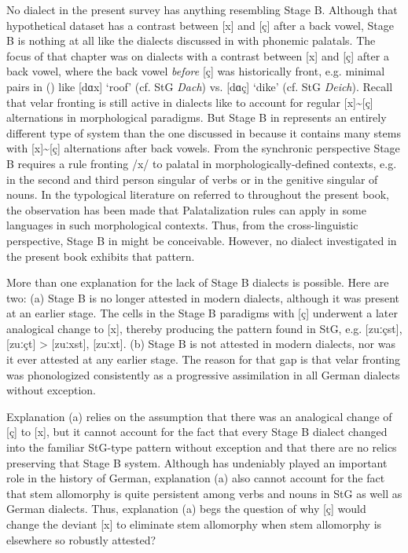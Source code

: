 No dialect in the present survey has anything resembling Stage B. Although that hypothetical dataset has a contrast between [x] and [ç] after a back vowel, Stage B is nothing at all like the dialects discussed in  with phonemic palatals. The focus of that chapter was on dialects with a contrast between [x] and [ç] after a back vowel, where the back vowel \textit{before} [ç] was historically front, e.g. minimal pairs in  () like [dɑx] ‘roof’ (cf. StG \textit{Dach}) vs. [dɑç] ‘dike’ (cf. StG \textit{Deich}). Recall that velar fronting is still active in dialects like  to account for regular [x]{\textasciitilde}[ç] alternations in morphological paradigms. But Stage B in  represents an entirely different type of system than the one discussed in  because it contains many stems with [x]{\textasciitilde}[ç] alternations after back vowels. From the synchronic perspective Stage B requires a rule fronting /x/ to palatal in morphologically-defined contexts, e.g. in the second and third person singular of verbs or in the genitive singular of nouns. In the typological literature on  referred to throughout the present book, the observation has been made that Palatalization rules can apply in some languages in such morphological contexts. Thus, from the cross-linguistic perspective, Stage B in  might be conceivable. However, no dialect investigated in the present book exhibits that pattern.

More than one explanation for the lack of Stage B dialects is possible. Here are two: (a) Stage B is no longer attested in modern dialects, although it was present at an earlier stage. The cells in the Stage B paradigms with [ç] underwent a later analogical change to [x], thereby producing the pattern found in StG, e.g. [zuːçst], [zuːçt] > [zuːxst], [zuːxt]. (b) Stage B is not attested in modern dialects, nor was it ever attested at any earlier stage. The reason for that gap is that velar fronting was phonologized consistently as a progressive assimilation in all German dialects without exception.

Explanation (a) relies on the assumption that there was an analogical change of [ç] to [x], but it cannot account for the fact that every Stage B dialect changed into the familiar StG-type pattern without exception and that there are no relics preserving that Stage B system. Although  has undeniably played an important role in the history of German, explanation (a) also cannot account for the fact that stem allomorphy is quite persistent among verbs and nouns in StG as well as German dialects. Thus, explanation (a) begs the question of why [ç] would change the deviant [x] to eliminate stem allomorphy when stem allomorphy is elsewhere so robustly attested?

